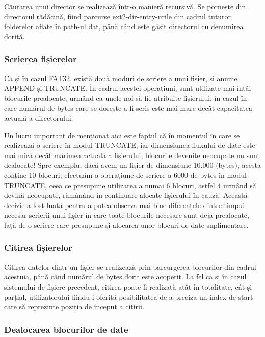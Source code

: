Căutarea unui director se realizează într-o manieră recursivă. Se pornește din directorul rădăcină, fiind parcurse ext2-dir-entry-urile din cadrul tuturor folderelor aflate în path-ul dat, până când este găsit directorul cu denumirea dorită.

\subsubsection{Scrierea fișierelor}

Ca și în cazul FAT32, există două moduri de scriere a unui fișier, și anume APPEND și TRUNCATE. În cadrul acestei operațiuni, sunt utilizate mai întâi blocurile prealocate, urmând ca unele noi să fie atribuite fișierului, în cazul în care numărul de bytes care se dorește a fi scris este mai mare decât capacitatea actuală a directorului.

Un lucru important de menționat aici este faptul că în momentul în care se realizează o scriere în modul TRUNCATE, iar dimensiunea fluxului de date este mai mică decât mărimea actuală a fișierului, blocurile devenite neocupate nu sunt dealocate! Spre exemplu, dacă avem un fișier de dimensiune 10.000 (bytes), acesta conține 10 blocuri; efectuăm o operațiune de scriere a 6000 de bytes în modul TRUNCATE, ceea ce presupune utilizarea a numai 6 blocuri, astfel 4 urmând să devină neocupate, rămânând în continuare alocate fișierului în cauză. Această decizie a fost luată pentru a putea observa mai bine diferențele dintre timpul necesar scrierii unui fișier în care toate blocurile necesare sunt deja prealocate, față de o scriere care presupune și alocarea unor blocuri de date suplimentare.

\subsubsection{Citirea fișierelor}

Citirea datelor dintr-un fișier se realizează prin parcurgerea blocurilor din cadrul acestuia, până când numărul de bytes dorit este acoperit. La fel ca și în cazul sistemului de fișiere precedent, citirea poate fi realizată atât în totalitate, cât și parțial, utilizatorului fiindu-i oferită posibilitatea de a preciza un index de start care să reprezinte poziția de început a citirii.

\subsubsection{Dealocarea blocurilor de date}

